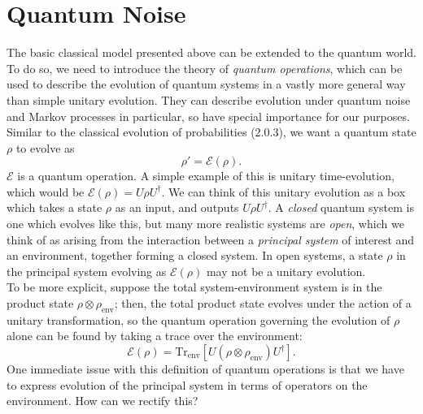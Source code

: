 \documentclass[12pt,a4paper]{report}
\numberwithin{equation}{section}
\theoremstyle{definition}
\theoremstyle{theorem}
\theoremstyle{theorem}
\theoremstyle{example}
\theoremstyle{definition}
\begin{document}
\section{Quantum Noise}
The basic classical model presented above can be extended to the quantum world. To do so, we need to introduce the theory of \textit{quantum operations}, which can be used to describe the evolution of quantum systems in a vastly more general way than simple unitary evolution. They can describe evolution under quantum noise and Markov processes in particular, so have special importance for our purposes.\\
Similar to the classical evolution of probabilities (2.0.3), we want a quantum state $\rho$ to evolve as
\begin{equation}
	\rho'=\mathcal{E}(\rho).
\end{equation}
$\mathcal{E}$ is a quantum operation. A simple example of this is unitary time-evolution, which would be $\mathcal{E}(\rho)=U\rho U^{\dagger}$. We can think of this unitary evolution as a box which takes a state $\rho$ as an input, and outputs $U\rho U^{\dagger}$. A \textit{closed} quantum system is one which evolves like this, but many more realistic systems are \textit{open}, which we think of as arising from the interaction between a \textit{principal system} of interest and an environment, together forming a closed system. In open systems, a state $\rho$ in the principal system evolving as $\mathcal{E}(\rho)$ may not be a unitary evolution.\\
To be more explicit, suppose the total system-environment system is in the product state $\rho\otimes\rho_{\text{env}}$; then, the total product state evolves under the action of a unitary transformation, so the quantum operation governing the evolution of $\rho$ alone can be found by taking a trace over the environment:
\begin{equation}
	\mathcal{E}(\rho)=\text{Tr}_{\text{env}}\left[U(\rho\otimes\rho_{\text{env}})U^{\dagger}\right].
\end{equation}
One immediate issue with this definition of quantum operations is that we have to express evolution of the principal system in terms of operators on the environment. How can we rectify this?
\end{document}
